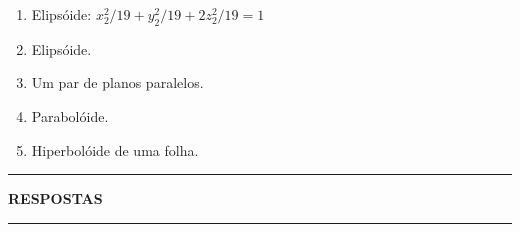 \documentclass[12pt]{exam}
\begin{document}
\begin{exercicio}
\begin{solucao}
\begin{enumerate}[label=({\alph*})]
            \item Elips\'oide: $x_2^2/19 + y_2^2/19 + 2z_2^2/19 = 1$
            \item Elips\'oide.
            \item Um par de planos paralelos.
            \item Parabol\'oide.
            \item Hiperbol\'oide de uma folha.
        \end{enumerate}
    \end{solucao}
\end{exercicio}


\newpage
{}
\hrule
\begin{center}
    {\large\bf RESPOSTAS}
\end{center}
\hrule

\end{document}
